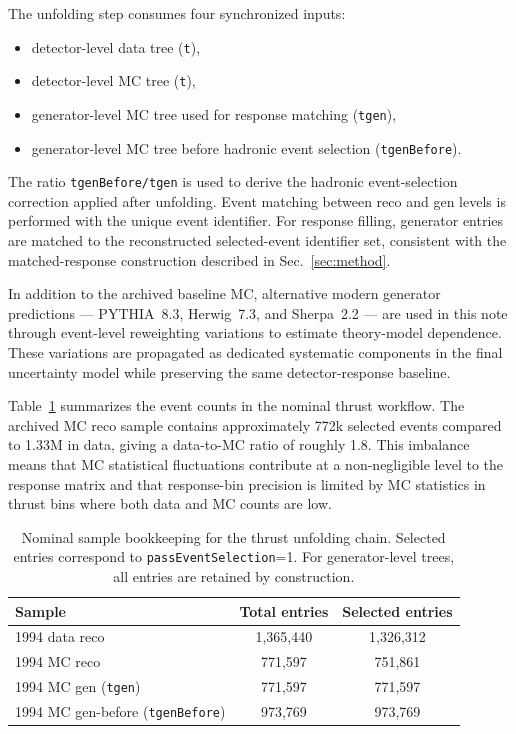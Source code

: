 The unfolding step consumes four synchronized inputs:
\begin{itemize}
\item detector-level data tree (\texttt{t}),
\item detector-level MC tree (\texttt{t}),
\item generator-level MC tree used for response matching (\texttt{tgen}),
\item generator-level MC tree before hadronic event selection (\texttt{tgenBefore}).
\end{itemize}

The ratio \texttt{tgenBefore/tgen} is used to derive the hadronic event-selection correction applied after unfolding. Event matching between reco and gen levels is performed with the unique event identifier. For response filling, generator entries are matched to the reconstructed selected-event identifier set, consistent with the matched-response construction described in Sec.~\ref{sec:method}.

In addition to the archived baseline MC, alternative modern generator predictions — PYTHIA~8.3, Herwig~7.3, and Sherpa~2.2 — are used in this note through event-level reweighting variations to estimate theory-model dependence. These variations are propagated as dedicated systematic components in the final uncertainty model while preserving the same detector-response baseline.

Table~\ref{tab:sample_bookkeeping} summarizes the event counts in the nominal thrust workflow. The archived MC reco sample contains approximately 772k selected events compared to 1.33M in data, giving a data-to-MC ratio of roughly 1.8. This imbalance means that MC statistical fluctuations contribute at a non-negligible level to the response matrix and that response-bin precision is limited by MC statistics in thrust bins where both data and MC counts are low.

\begin{table}[t!]
\centering
\begin{tabular}{l c c}
\hline
Sample & Total entries & Selected entries \\
\hline
1994 data reco & 1,365,440 & 1,326,312 \\
1994 MC reco & 771,597 & 751,861 \\
1994 MC gen (\texttt{tgen}) & 771,597 & 771,597 \\
1994 MC gen-before (\texttt{tgenBefore}) & 973,769 & 973,769 \\
\hline
\end{tabular}
\caption{Nominal sample bookkeeping for the thrust unfolding chain. Selected entries correspond to \texttt{passEventSelection}=1. For generator-level trees, all entries are retained by construction.}
\label{tab:sample_bookkeeping}
\end{table}
